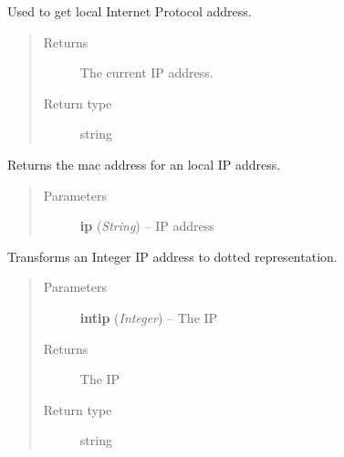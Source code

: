 \documentclass[letterpaper,10pt,english]{sphinxmanual}
\begin{document}

\begin{fulllineitems}
\label{utils:utils.GetLocalIPAddress}
Used to get local Internet Protocol address.
\begin{quote}\begin{description}
\item[{Returns}] \leavevmode
The current IP address.

\item[{Return type}] \leavevmode
string

\end{description}\end{quote}

\end{fulllineitems}


\begin{fulllineitems}
\label{utils:utils.GetMacForIp}
Returns the mac address for an local IP address.
\begin{quote}\begin{description}
\item[{Parameters}] \leavevmode
\textbf{ip} (\emph{String}) -- IP address

\end{description}\end{quote}

\end{fulllineitems}


\begin{fulllineitems}
\label{utils:utils.IntToDottedIP}
Transforms an Integer IP address to dotted representation.
\begin{quote}\begin{description}
\item[{Parameters}] \leavevmode
\textbf{intip} (\emph{Integer}) -- The IP

\item[{Returns}] \leavevmode
The IP

\item[{Return type}] \leavevmode
string

\end{description}\end{quote}

\end{fulllineitems}
\end{document}
